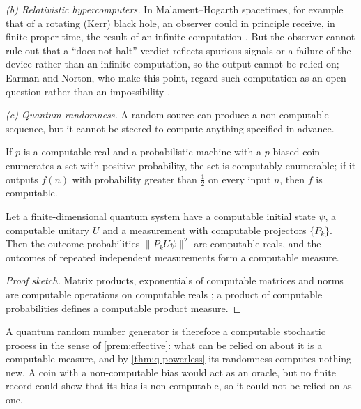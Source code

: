 \emph{(b) Relativistic hypercomputers.} In Malament--Hogarth spacetimes, for example
that of a rotating (Kerr) black hole, an observer could in principle receive, in finite proper time, the result of an infinite
computation \citep{hogarth1992,etesi-nemeti2002}. But the observer cannot rule out
that a ``does not halt'' verdict reflects spurious signals or a failure of the device
rather than an infinite computation, so the output cannot be relied on; Earman and
Norton, who make this point, regard such computation as an open question rather than
an impossibility \citep{earman-norton1993}.

\emph{(c) Quantum randomness.} A random source can produce a non-computable sequence,
but it cannot be steered to compute anything specified in advance.

\begin{theorem}\label{thm:q-powerless}
If $p$ is a computable real and a probabilistic machine with a $p$-biased coin
enumerates a set with positive probability, the set is computably enumerable; if it
outputs $f(n)$ with probability greater than $\tfrac12$ on every input $n$, then $f$
is computable.
\end{theorem}

\begin{proposition}\label{prop:q-born-computable}
Let a finite-dimensional quantum system have a computable initial state $\psi$, a
computable unitary $U$ and a measurement with computable projectors $\{P_k\}$. Then
the outcome probabilities $\lVert P_kU\psi\rVert^2$ \citep{born1926} are computable
reals, and the outcomes of repeated independent measurements form a computable
measure.
\end{proposition}

\begin{proof}[Proof sketch]
Matrix products, exponentials of computable matrices and norms are computable
operations on computable reals \citep{weihrauch2000,pourel-richards1989}; a product
of computable probabilities defines a computable product measure.
\end{proof}

A quantum random number generator is therefore a computable stochastic process in
the sense of \cref{prem:effective}: what can be relied on about it is a computable
measure, and by \cref{thm:q-powerless} its randomness computes nothing new. A coin
with a non-computable bias would act as an oracle, but no finite record could show
that its bias is non-computable, so it could not be relied on as one.


